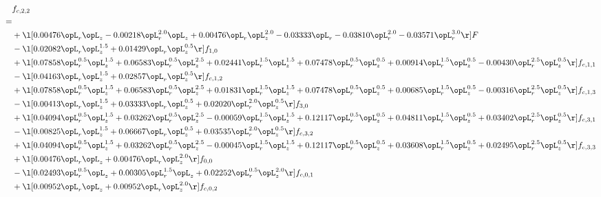 \begin{alignat}{2} 
\label{eq:f_22_1} 
& f_{c,2,2} \nonumber \\ 
 = \\ 
& + \l[  0.00476 \opL_r \opL_z   -0.00218 \opL_r^{2.0} \opL_z +  0.00476 \opL_r \opL_z^{2.0}   -0.03333 \opL_r   -0.03810 \opL_r^{2.0}   -0.03571 \opL_r^{3.0}  \r] F \nonumber \\ 
& - \l[  0.02082 \opL_r \opL_z^{1.5} +  0.01429 \opL_r \opL_z^{0.5}  \r] f_{1,0} \nonumber \\ 
& + \l[  0.07858 \opL_r^{0.5} \opL_z^{1.5} +  0.06583 \opL_r^{0.5} \opL_z^{2.5} +  0.02441 \opL_r^{1.5} \opL_z^{1.5} +  0.07478 \opL_r^{0.5} \opL_z^{0.5} +  0.00914 \opL_r^{1.5} \opL_z^{0.5}   -0.00430 \opL_r^{2.5} \opL_z^{0.5}  \r] f_{c,1,1} \nonumber \\ 
& - \l[  0.04163 \opL_r \opL_z^{1.5} +  0.02857 \opL_r \opL_z^{0.5}  \r] f_{c,1,2} \nonumber \\ 
& + \l[  0.07858 \opL_r^{0.5} \opL_z^{1.5} +  0.06583 \opL_r^{0.5} \opL_z^{2.5} +  0.01831 \opL_r^{1.5} \opL_z^{1.5} +  0.07478 \opL_r^{0.5} \opL_z^{0.5} +  0.00685 \opL_r^{1.5} \opL_z^{0.5}   -0.00316 \opL_r^{2.5} \opL_z^{0.5}  \r] f_{c,1,3} \nonumber \\ 
& - \l[  0.00413 \opL_r \opL_z^{1.5} +  0.03333 \opL_r \opL_z^{0.5} +  0.02020 \opL_r^{2.0} \opL_z^{0.5}  \r] f_{3,0} \nonumber \\ 
& + \l[  0.04094 \opL_r^{0.5} \opL_z^{1.5} +  0.03262 \opL_r^{0.5} \opL_z^{2.5}   -0.00059 \opL_r^{1.5} \opL_z^{1.5} +  0.12117 \opL_r^{0.5} \opL_z^{0.5} +  0.04811 \opL_r^{1.5} \opL_z^{0.5} +  0.03402 \opL_r^{2.5} \opL_z^{0.5}  \r] f_{c,3,1} \nonumber \\ 
& - \l[  0.00825 \opL_r \opL_z^{1.5} +  0.06667 \opL_r \opL_z^{0.5} +  0.03535 \opL_r^{2.0} \opL_z^{0.5}  \r] f_{c,3,2} \nonumber \\ 
& + \l[  0.04094 \opL_r^{0.5} \opL_z^{1.5} +  0.03262 \opL_r^{0.5} \opL_z^{2.5}   -0.00045 \opL_r^{1.5} \opL_z^{1.5} +  0.12117 \opL_r^{0.5} \opL_z^{0.5} +  0.03608 \opL_r^{1.5} \opL_z^{0.5} +  0.02495 \opL_r^{2.5} \opL_z^{0.5}  \r] f_{c,3,3} \nonumber \\ 
& + \l[  0.00476 \opL_r \opL_z +  0.00476 \opL_r \opL_z^{2.0}  \r] f_{0,0} \nonumber \\ 
& - \l[  0.02493 \opL_r^{0.5} \opL_z +  0.00305 \opL_r^{1.5} \opL_z +  0.02252 \opL_r^{0.5} \opL_z^{2.0}  \r] f_{c,0,1} \nonumber \\ 
& + \l[  0.00952 \opL_r \opL_z +  0.00952 \opL_r \opL_z^{2.0}  \r] f_{c,0,2} \nonumber \\ 

\end{alignat}
